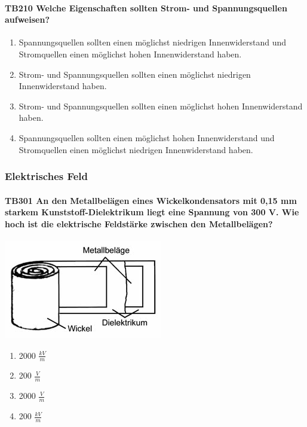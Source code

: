 \documentclass[8pt]{article}
\begin{document}
\begin{enumerate}
\paragraph*{TB210 Welche Eigenschaften sollten Strom- und Spannungsquellen aufweisen?}
\begin{enumerate}[nolistsep,label=\Alph*]
\item Spannungsquellen sollten einen möglichst niedrigen Innenwiderstand und Stromquellen einen möglichst hohen Innenwiderstand haben.
\item Strom- und Spannungsquellen sollten einen möglichst niedrigen Innenwiderstand haben. 
\item Strom- und Spannungsquellen sollten einen möglichst hohen Innenwiderstand haben.
\item Spannungsquellen sollten einen möglichst hohen Innenwiderstand und Stromquellen einen möglichst niedrigen Innenwiderstand haben.
\end{enumerate}


\pagebreak
\subsubsection{Elektrisches Feld}


\paragraph*{TB301 An den Metallbelägen eines Wickelkondensators mit 0,15 mm starkem Kunststoff-Dielektrikum liegt eine Spannung von 300 V. Wie hoch ist die elektrische Feldstärke zwischen den Metallbelägen?}
\begin{center}
	\begin{minipage}{\linewidth}
		\centering
		\includegraphics[scale=0.7]{pics/tb301_a.jpg}
	\end{minipage}
\end{center}
\begin{enumerate}[nolistsep,label=\Alph*]
\item 2000 $\frac{kV}{m}$
\item 200 $\frac{V}{m}$
\item 2000 $\frac{V}{m}$
\item 200 $\frac{kV}{m}$
\end{enumerate}




\end{enumerate}
\end{document}

